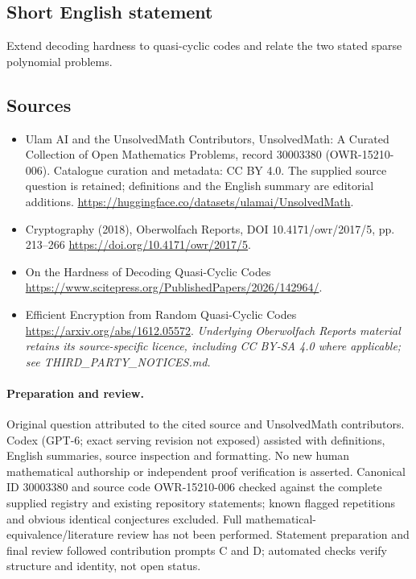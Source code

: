 \documentclass[11pt]{article}
\begin{document}
\subsection{Short English statement}
Extend decoding hardness to quasi-cyclic codes and relate the two stated sparse polynomial problems.
\subsection{Sources}
\begin{itemize}
\item[\hypertarget{source:30003380:1}{S1}] Ulam AI and the UnsolvedMath Contributors, UnsolvedMath: A Curated Collection of Open Mathematics Problems, record 30003380 (OWR-15210-006). Catalogue curation and metadata: CC BY 4.0. The supplied source question is retained; definitions and the English summary are editorial additions.
\url{https://huggingface.co/datasets/ulamai/UnsolvedMath}.
\item[\hypertarget{source:30003380:2}{S2}] Cryptography (2018), Oberwolfach Reports, DOI 10.4171/owr/2017/5, pp. 213--266
\url{https://doi.org/10.4171/owr/2017/5}.
\item[\hypertarget{source:30003380:3}{S3}] On the Hardness of Decoding Quasi-Cyclic Codes
\url{https://www.scitepress.org/PublishedPapers/2026/142964/}.
\item[\hypertarget{source:30003380:4}{S4}] Efficient Encryption from Random Quasi-Cyclic Codes
\url{https://arxiv.org/abs/1612.05572}.
\textit{Underlying Oberwolfach Reports material retains its source-specific licence, including CC BY-SA 4.0 where applicable; see THIRD\_PARTY\_NOTICES.md.}
\end{itemize}
\paragraph{Preparation and review.}
Original question attributed to the cited source and UnsolvedMath contributors. Codex (GPT-6; exact serving revision not exposed) assisted with definitions, English summaries, source inspection and formatting. No new human mathematical authorship or independent proof verification is asserted. Canonical ID 30003380 and source code OWR-15210-006 checked against the complete supplied registry and existing repository statements; known flagged repetitions and obvious identical conjectures excluded. Full mathematical-equivalence/literature review has not been performed. Statement preparation and final review followed contribution prompts C and D; automated checks verify structure and identity, not open status.
\label{end:30003380}
\end{document}
